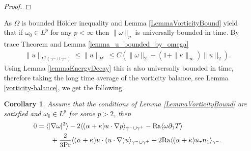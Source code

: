 \documentclass{article}
\newtheorem{corollary}[theorem]{Corollary}
\theoremstyle{definition}
\theoremstyle{definition}
\newcommand{\Pra}{\rm{Pr}}
\newcommand{\Ra}{{\rm{Ra}}}
\begin{document}
\begin{proof}
 
\end{proof}

As $\Omega$ is bounded Hölder inequality and Lemma \ref{LemmaVorticityBound} yield that if $\omega_0 \in L^p$ for any $p<\infty$ then $\|\omega\|_p$ is universally bounded in time. By trace Theorem and Lemma \ref{lemma_u_bounded_by_omega}
\begin{align*}
    \|u\|_{L^2(\gamma^-\cup\gamma^+)}\leq \|u\|_{H^1} \leq C\left(\|\omega\|_2+(1+\|\kappa\|_\infty)\|u\|_2\right).
\end{align*}
Using Lemma \ref{lemmaEnergyDecay} this is also universally bounded in time, therefore taking the long time average of the vorticity balance, see Lemma \ref{vorticity-balance}, we get the following.

\begin{corollary}
Assume that the conditions of Lemma \ref{LemmaVorticityBound} are satisfied and $\omega_0\in L^p$ for some $p>2$, then
\begin{equation}
    \label{average-enstrophy-balance}
    \begin{aligned}
        0 &= \langle |\nabla \omega|^2\rangle - 2 \langle (\alpha+\kappa) u\cdot \nabla p \rangle_{\gamma^-\cup\gamma^+} - \Ra \langle \omega\partial_1 T\rangle 
        \\
        &\qquad + \frac{2}{3\Pra} \langle (\alpha+\kappa) u\cdot (u\cdot\nabla) u\rangle_{\gamma^-\cup\gamma^+} + 2\Ra \langle (\alpha+\kappa) u_\tau n_1\rangle_{\gamma^-}.
    \end{aligned}
\end{equation}
\end{corollary}
\end{document}
